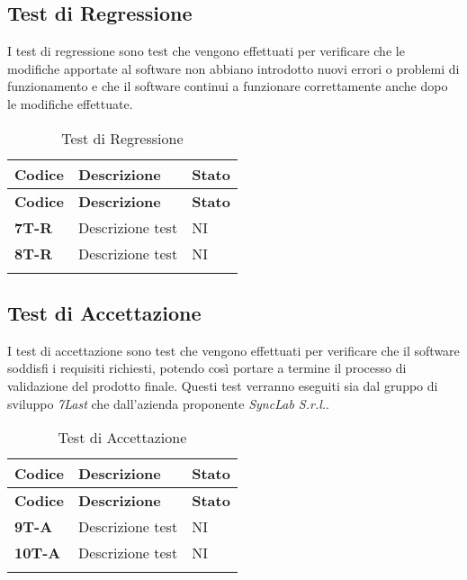\subsection{Test di Regressione}
I test di regressione sono test che vengono effettuati per verificare che le modifiche apportate al software non abbiano introdotto nuovi errori o problemi di funzionamento e che il software continui a funzionare correttamente anche dopo le modifiche effettuate. \\
\begin{longtable}{|>{\raggedright\arraybackslash}m{}|>{\raggedright\arraybackslash}m{}|>{\raggedright\arraybackslash}m{}|}
	\hline
	\textbf{Codice} & \textbf{Descrizione} & \textbf{Stato} \\
	\hline
	\endfirsthead
	\hline
	\textbf{Codice} & \textbf{Descrizione} & \textbf{Stato} \\
	\endhead
	\textbf{7T-R}   & Descrizione test     & NI             \\
	\hline
	\textbf{8T-R}   & Descrizione test     & NI             \\
	\hline
	\caption{Test di Regressione} %
	\label{table:15}
\end{longtable}

\subsection{Test di Accettazione}
I test di accettazione sono test che vengono effettuati per verificare che il software soddisfi i requisiti richiesti, potendo così portare a termine il processo di validazione del prodotto finale. Questi test verranno eseguiti sia dal gruppo di sviluppo \textit{7Last} che dall'azienda proponente \textit{SyncLab S.r.l.}. \\
\begin{longtable}{|>{\raggedright\arraybackslash}m{}|>{\raggedright\arraybackslash}m{}|>{\raggedright\arraybackslash}m{}|}
	\hline
	\textbf{Codice} & \textbf{Descrizione} & \textbf{Stato} \\
	\hline
	\endfirsthead
	\hline
	\textbf{Codice} & \textbf{Descrizione} & \textbf{Stato} \\
	\endhead
	\textbf{9T-A}   & Descrizione test     & NI             \\
	\hline
	\textbf{10T-A}   & Descrizione test     & NI             \\
	\hline
	\caption{Test di Accettazione} %
	\label{table:16}
\end{longtable}
